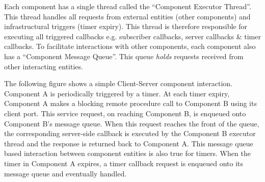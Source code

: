 \documentclass[letterpaper,10pt,english]{sphinxmanual}
\begin{document}

Each component has a single thread called the ``Component Executor Thread''. This thread handles all requests from external entities (other components) and infrastructural triggers (timer expiry). This thread is therefore responsible for executing all triggered callbacks e.g. subscriber callbacks, server callbacks \& timer callbacks. To facilitate interactions with other components, each component also has a ``Component Message Queue''. This queue \emph{holds} requests received from other interacting entities.

The following figure shows a simple Client-Server component interaction. Component A is periodically triggered by a timer. At each timer expiry, Component A makes a blocking remote procedure call to Component B using its client port. This service request, on reaching Component B, is enqueued onto Component B's message queue. When this request reaches the front of the queue, the corresponding server-side callback is executed by the Component B executor thread and the response is returned back to Component A. This message queue based interaction between component entities is also true for timers. When the timer in Component A expires, a timer callback request is enqueued onto its message queue and eventually handled.

{\hfill{}\hfill}
\end{document}
